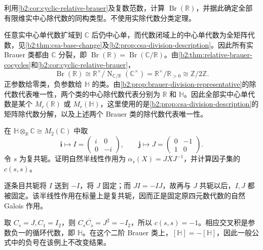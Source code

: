 \begin{exercise}\label{b2:ex:18-real-brauer-group}
	利用\cref{b2:cor:cyclic-relative-brauer}及复数范数，计算 \(\operatorname{Br}(\mathbb R)\)，并据此确定全部有限维实中心除代数的同构类型。不使用实除代数分类定理。
\end{exercise}
\begin{solution}
	任意实中心单代数扩域到 \(\mathbb C\) 后仍中心单，而代数闭域上的中心单代数为全矩阵代数，见\cref{b2:thm:csa-base-change}及\cref{b2:prop:csa-division-description}。因此所有实 Brauer 类都由 \(\mathbb C\) 分裂，即 \(\operatorname{Br}(\mathbb R)=\operatorname{Br}(\mathbb C/\mathbb R)\)。由\cref{b2:thm:relative-brauer-cocycles}和\cref{b2:cor:cyclic-relative-brauer}，
	\[
		\operatorname{Br}(\mathbb R) \cong\mathbb R^\times/\operatorname{N}_{\mathbb C/\mathbb R}(\mathbb C^\times) =\mathbb R^\times/\mathbb R_{>0} \cong\mathbb Z/2\mathbb Z.
	\]
	正参数给零类，负参数给 \(\mathbb H\) 的类。由\cref{b2:prop:brauer-division-representative}的除代数代表唯一性，两个类的中心除代数代表分别为 \(\mathbb R\) 和 \(\mathbb H\)。因此全部实中心单代数是某个 \(M_r(\mathbb R)\) 或 \(M_r(\mathbb H)\)，这里使用的是\cref{b2:prop:csa-division-description}的矩阵除代数分解，以及上述两个 Brauer 类的除代数代表唯一性。
\end{solution}

\begin{exercise}\label{b2:ex:18-quaternion-factor-set}
	在 \(\mathbb H\otimes_{\mathbb R}\mathbb C\cong M_2(\mathbb C)\) 中取
	\[
		\mathbf i\longmapsto I=\begin{pmatrix}i&0\\0&-i\end{pmatrix},\qquad
		\mathbf j\longmapsto J=\begin{pmatrix}0&-1\\1&0\end{pmatrix}.
	\]
	令 \(s\) 为复共轭。证明自然半线性作用为 \(\alpha_s(X)=J\overline XJ^{-1}\)，并计算因子集的 \(c(s,s)\)。
\end{exercise}
\begin{solution}
	逐条目共轭将 \(I\) 送到 \(-I\)，将 \(J\) 固定；而 \(JI=-IJ\)，故再与 \(J\) 共轭以后，\(I,J\) 都被固定。该半线性作用在标量上是复共轭，因而正是固定原四元数代数的自然 Galois 作用。

	取 \(C_s=J,C_1=I_2\)，则 \(C_s\overline{C_s}=J^2=-I_2\)，所以 \(c(s,s)=-1\)。相应交叉积是参数负一的循环代数，即 \(\mathbb H\)。在这个二阶 Brauer 类上，\([\mathbb H]=-[\mathbb H]\)，因此一般公式中的负号在该例上不改变结果。
\end{solution}

